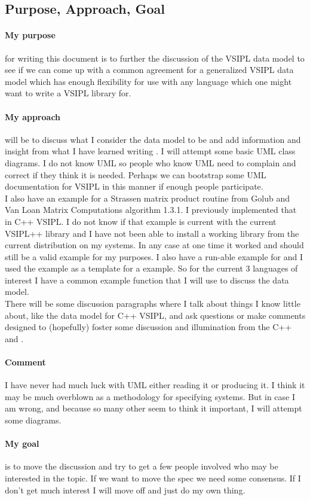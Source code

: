 \subsection{Purpose, Approach, Goal}
\paragraph{My purpose} for writing this document is to further the discussion of the VSIPL data model to see if we can come up with a common agreement for a generalized VSIPL data model which has enough flexibility for use with any language which one might want to write a VSIPL library for.  
\paragraph{My approach} will be to discuss what I consider the \cvl{} data model to be and add information and insight from what I have learned writing \pyjv{}.  I will attempt some basic UML class diagrams.  I do not know UML so people who know UML need to complain and correct if they think it is needed. Perhaps we can bootstrap some UML documentation for VSIPL in this manner if enough people participate.
\\[6pt]
I also have an example for a Strassen matrix product routine from Golub and Van Loan Matrix Computations algorithm 1.3.1.  I previously implemented that in C++ VSIPL.  I do not know if that example is current with the current VSIPL++ library and I have not been able to install a working library from the current distribution on my systems.  In any case at one time it worked and should still be a valid example for my purposes.  I also have a run-able example for \cvl{} and I used the \cvl{} example as a template for a \pyjv{} example.  So for the current 3 languages of interest I have a common example function that I will use to discuss the data model.
\\[6pt]
There will be some discussion paragraphs where I talk about things I know little about, like the data model for C++ VSIPL, and ask questions or make comments designed to (hopefully) foster some discussion and illumination from the C++  and .
\paragraph{Comment}
I have never had much luck with UML either reading it or producing it. I think it may be much overblown as a methodology for specifying systems.  But in case I am wrong, and because so many other seem to think it important, I will attempt some diagrams.  
\paragraph{My goal} is to move the discussion and try to get a few people involved who may be interested in the topic.  If we want to move the spec we need some consensus. If I don't get much interest I will move off and just do my own thing.
